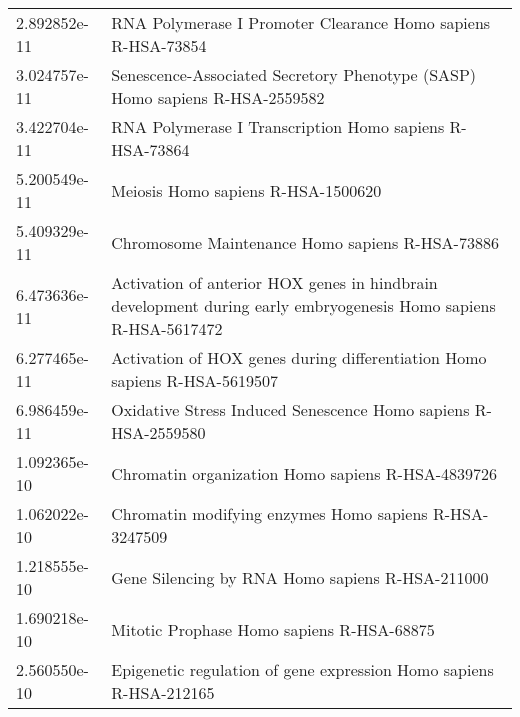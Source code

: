\begin{longtable}{p{2.4cm}p{14.5cm}}
             2.892852e-11 &                                                                          RNA Polymerase I Promoter Clearance Homo sapiens R-HSA-73854 \\
             3.024757e-11 &                                                           Senescence-Associated Secretory Phenotype (SASP) Homo sapiens R-HSA-2559582 \\
             3.422704e-11 &                                                                               RNA Polymerase I Transcription Homo sapiens R-HSA-73864 \\
             5.200549e-11 &                                                                                                    Meiosis Homo sapiens R-HSA-1500620 \\
             5.409329e-11 &                                                                                       Chromosome Maintenance Homo sapiens R-HSA-73886 \\
             6.473636e-11 &                       Activation of anterior HOX genes in hindbrain development during early embryogenesis Homo sapiens R-HSA-5617472 \\
             6.277465e-11 &                                                             Activation of HOX genes during differentiation Homo sapiens R-HSA-5619507 \\
             6.986459e-11 &                                                                        Oxidative Stress Induced Senescence Homo sapiens R-HSA-2559580 \\
             1.092365e-10 &                                                                                     Chromatin organization Homo sapiens R-HSA-4839726 \\
             1.062022e-10 &                                                                                Chromatin modifying enzymes Homo sapiens R-HSA-3247509 \\
             1.218555e-10 &                                                                                       Gene Silencing by RNA Homo sapiens R-HSA-211000 \\
             1.690218e-10 &                                                                                             Mitotic Prophase Homo sapiens R-HSA-68875 \\
             2.560550e-10 &                                                                    Epigenetic regulation of gene expression Homo sapiens R-HSA-212165 \\

\end{longtable}
